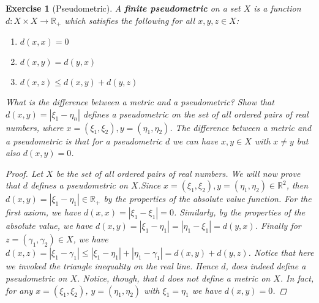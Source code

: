 \documentclass[11pt]{article}
\theoremstyle{mystyle}
\newtheorem{protoexer}{Exercise}[section]
\newenvironment{exer}
{\colorlet{shadecolor}{blue!15}\begin{shaded}\begin{protoexer}}
{\end{protoexer}\end{shaded}}
\begin{document}
\begin{exer}[Pseudometric]\label{pseudometric}
A \textbf{finite pseudometric} on a set $X$ is a function $d: X \times X \longrightarrow \mathbb{R}_+$ which satisfies the following for all $x, y, z \in X$:
\begin{enumerate}
    \item $d(x, x) = 0$
    \item $d(x, y) = d(y, x)$
    \item $d(x, z) \leq d(x, y) + d(y,z)$
\end{enumerate}
What is the difference between a metric and a pseudometric? Show that $d(x, y) = |\xi_1 - \eta_n|$ defines a pseudometric on the set of all ordered pairs of real numbers, where $x = (\xi_1, \xi_2), y = (\eta_1, \eta_2)$.\newline
The difference between a metric and a pseudometric is that for a pseudometric $d$ we can have $x, y \in X$ with $x \neq y$ but also $d(x, y) = 0$.
\begin{proof}
Let $X$ be the set of all ordered pairs of real numbers. We will now prove that $d$ defines a pseudometric on $X$.\newline Since $x = (\xi_1, \xi_2), y = (\eta_1, \eta_2) \in \mathbb{R}^2$, then $d(x, y) = |\xi_1 - \eta_1| \in \mathbb{R}_+$ by the properties of the absolute value function. For the first axiom, we have $d(x, x) = |\xi_1 - \xi_1| = 0$. Similarly, by the properties of the absolute value, we have $d(x, y) = |\xi_1 - \eta_1| = |\eta_1 - \xi_1| = d(y, x)$. Finally for $z = (\gamma_1, \gamma_2) \in X$, we have $d(x, z) = |\xi_1 - \gamma_1| \leq |\xi_1 - \eta_1| + |\eta_1 - \gamma_1| = d(x, y) + d(y, z)$. Notice that here we invoked the triangle inequality on the real line. Hence $d$, does indeed define a pseudometric on $X$.\newline
Notice, though, that $d$ does not define a metric on $X$. In fact, for any $x=(\xi_1, \xi_2)$, $y=(\eta_1, \eta_2)$ with $\xi_1 = \eta_1$ we have $d(x,y) = 0$.
\end{proof}
\end{exer}
\end{document}

